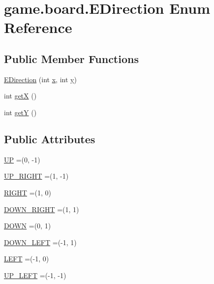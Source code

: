 \hypertarget{enumgame_1_1board_1_1_e_direction}{}\section{game.\+board.\+E\+Direction Enum Reference}
\label{enumgame_1_1board_1_1_e_direction}
\subsection*{Public Member Functions}
\begin{DoxyCompactItemize}
\item 
\mbox{\hyperlink{enumgame_1_1board_1_1_e_direction_ad0ffe94ba37b3995c795079b7595e6b4}{E\+Direction}} (int \mbox{\hyperlink{enumgame_1_1board_1_1_e_direction_ae37acdcda2b9383068ffe587a17c5991}{x}}, int \mbox{\hyperlink{enumgame_1_1board_1_1_e_direction_a6f3fc300f2b86e553a066e9a5d85a2b0}{y}})
\item 
int \mbox{\hyperlink{enumgame_1_1board_1_1_e_direction_a28cdb19c1526655a4a28989d731c0b5a}{getX}} ()
\item 
int \mbox{\hyperlink{enumgame_1_1board_1_1_e_direction_aa2aa024ab277dd1c240e0ab77b2b248c}{getY}} ()
\end{DoxyCompactItemize}
\subsection*{Public Attributes}
\begin{DoxyCompactItemize}
\item 
\mbox{\hyperlink{enumgame_1_1board_1_1_e_direction_af476539ae28a0fdcd6cca1ef413f2718}{UP}} =(0, -\/1)
\item 
\mbox{\hyperlink{enumgame_1_1board_1_1_e_direction_ae955de16c06ec628bce8c432ece1c218}{U\+P\+\_\+\+R\+I\+G\+HT}} =(1, -\/1)
\item 
\mbox{\hyperlink{enumgame_1_1board_1_1_e_direction_adb6832474b5ffbbf0e60ddab9b52d00d}{R\+I\+G\+HT}} =(1, 0)
\item 
\mbox{\hyperlink{enumgame_1_1board_1_1_e_direction_aba00c7196d668b8d7a0501dda07fa5a4}{D\+O\+W\+N\+\_\+\+R\+I\+G\+HT}} =(1, 1)
\item 
\mbox{\hyperlink{enumgame_1_1board_1_1_e_direction_a6955bc1cc480c347473b410f5d2992bb}{D\+O\+WN}} =(0, 1)
\item 
\mbox{\hyperlink{enumgame_1_1board_1_1_e_direction_a51f3678132a14c08493976afa7ff277e}{D\+O\+W\+N\+\_\+\+L\+E\+FT}} =(-\/1, 1)
\item 
\mbox{\hyperlink{enumgame_1_1board_1_1_e_direction_a60663cfdf0c2752a199118bce2d90db8}{L\+E\+FT}} =(-\/1, 0)
\item 
\mbox{\hyperlink{enumgame_1_1board_1_1_e_direction_abf03cea1bd34462479291c5bb6f452ab}{U\+P\+\_\+\+L\+E\+FT}} =(-\/1, -\/1)
\end{DoxyCompactItemize}
